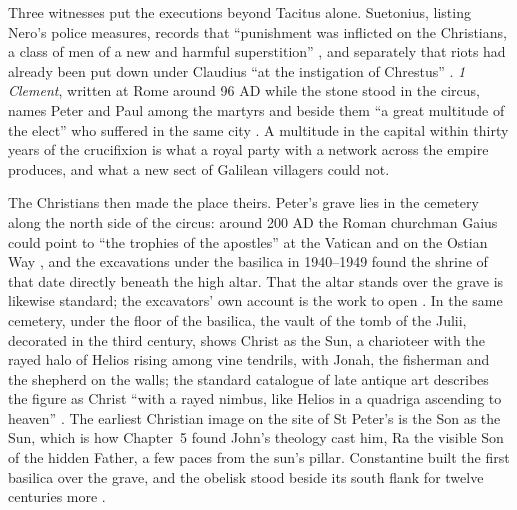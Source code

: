Three witnesses put the executions beyond Tacitus alone.
Suetonius, listing Nero's police measures, records that ``punishment was inflicted on the Christians, a class of men of a new and harmful superstition'' \cite[Nero 16]{suetonius:caesars}, and separately that riots had already been put down under Claudius ``at the instigation of Chrestus'' \cite[25.4]{suetonius:claudius}.
\emph{1 Clement}, written at Rome around 96 AD while the stone stood in the circus, names Peter and Paul among the martyrs and beside them ``a great multitude of the elect'' who suffered in the same city \cite[5--6]{clement:firstclement}.
A multitude in the capital within thirty years of the crucifixion is what a royal party with a network across the empire produces, and what a new sect of Galilean villagers could not.

The Christians then made the place theirs.
Peter's grave lies in the cemetery along the north side of the circus: around 200 AD the Roman churchman Gaius could point to ``the trophies of the apostles'' at the Vatican and on the Ostian Way \cite[2.25.7]{eusebius:he}, and the excavations under the basilica in 1940--1949 found the shrine of that date directly beneath the high altar.
That the altar stands over the grave is likewise standard; the excavators' own account is the work to open \cite{toynbee:shrine-of-st-peter}.
In the same cemetery, under the floor of the basilica, the vault of the tomb of the Julii, decorated in the third century, shows Christ as the Sun, a charioteer with the rayed halo of Helios rising among vine tendrils, with Jonah, the fisherman and the shepherd on the walls; the standard catalogue of late antique art describes the figure as Christ ``with a rayed nimbus, like Helios in a quadriga ascending to heaven'' \cite[531--532]{weitzmann:age-of-spirituality}.
The earliest Christian image on the site of St Peter's is the Son as the Sun, which is how Chapter~5 found John's theology cast him, Ra the visible Son of the hidden Father, a few paces from the sun's pillar.
Constantine built the first basilica over the grave, and the obelisk stood beside its south flank for twelve centuries more \cite{iversen:obelisks-in-exile}.

